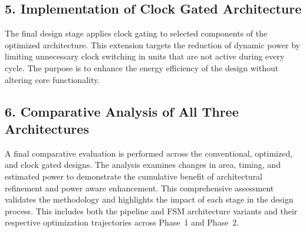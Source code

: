 \subsection*{5. Implementation of Clock Gated Architecture}

The final design stage applies clock gating to selected components of the optimized 
architecture. This extension targets the reduction of dynamic power by limiting unnecessary 
clock switching in units that are not active during every cycle. The purpose is to enhance the 
energy efficiency of the design without altering core functionality.

\subsection*{6. Comparative Analysis of All Three Architectures}

A final comparative evaluation is performed across the conventional, optimized, and clock
gated designs. The analysis examines changes in area, timing, and estimated power to
demonstrate the cumulative benefit of architectural refinement and power aware enhancement.
This comprehensive assessment validates the methodology and highlights the impact of each
stage in the design process. This includes both the pipeline and FSM architecture variants and their
respective optimization trajectories across Phase~1 and Phase~2.

